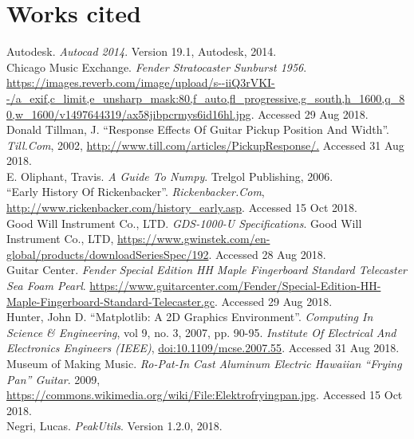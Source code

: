 \documentclass{article}
\begin{document}
\section*{Works cited}
\begin{hangparas}{.25in}{1}
Autodesk. \textit{Autocad 2014}. Version 19.1, Autodesk, 2014.\\

Chicago Music Exchange. \textit{Fender Stratocaster Sunburst 1956}. \url{https://images.reverb.com/image/upload/s--iiQ3rVKI--/a_exif,c_limit,e_unsharp_mask:80,f_auto,fl_progressive,g_south,h_1600,q_80,w_1600/v1497644319/ax58jibpcrmys6id16hl.jpg}. Accessed 29 Aug 2018.\\

Donald Tillman, J. ``Response Effects Of Guitar Pickup Position And Width''. 
\textit{Till.Com}, 2002, \url{http://www.till.com/articles/PickupResponse/.} 
Accessed 31 Aug 2018.\\

E. Oliphant, Travis. \textit{A Guide To Numpy}. Trelgol Publishing, 2006.\\

``Early History Of Rickenbacker''. \textit{Rickenbacker.Com},
\url{http://www.rickenbacker.com/history_early.asp}. Accessed 15 Oct 2018. \\


Good Will Instrument Co., LTD. \textit{GDS-1000-U Specifications}. Good Will 
Instrument Co., LTD, 
\url{https://www.gwinstek.com/en-global/products/downloadSeriesSpec/192}. 
Accessed 28 Aug 2018.\\
Guitar Center. \textit{Fender Special Edition HH Maple Fingerboard Standard 
Telecaster Sea Foam Pearl}. \url{https://www.guitarcenter.com/Fender/Special-Edition-HH-Maple-Fingerboard-Standard-Telecaster.gc}. Accessed 29 Aug 2018.\\

Hunter, John D. ``Matplotlib: A 2D Graphics Environment''. \textit{Computing 
In Science \& Engineering}, vol 9, no. 3, 2007, pp. 90-95. \textit{Institute 
Of Electrical And Electronics Engineers (IEEE)}, 
\url{doi:10.1109/mcse.2007.55}. Accessed 31 Aug 2018.\\

Museum of Making Music. \textit{Ro-Pat-In Cast Aluminum Electric Hawaiian
``Frying Pan'' Guitar}. 2009,
\url{https://commons.wikimedia.org/wiki/File:Elektrofryingpan.jpg}. Accessed 15
Oct 2018. \\

Negri, Lucas. \textit{PeakUtils}. Version 1.2.0, 2018.\\


\end{hangparas}
\end{document}
